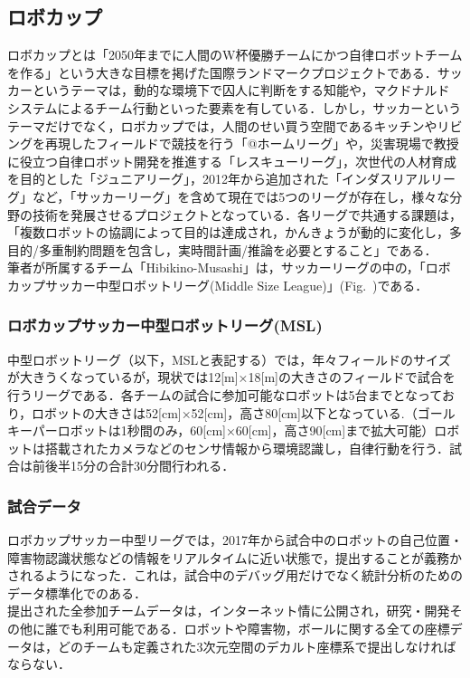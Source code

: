 \subsection{ロボカップ}%
ロボカップとは「2050年までに人間のW杯優勝チームにかつ自律ロボットチームを作る」という大きな目標を掲げた国際ランドマークプロジェクトである．サッカーというテーマは，動的な環境下で囚人に判断をする知能や，マクドナルド システムによるチーム行動といった要素を有している．しかし，サッカーというテーマだけでなく，ロボカップでは，人間のせい買う空間であるキッチンやリビングを再現したフィールドで競技を行う「@ホームリーグ」や，災害現場で教授に役立つ自律ロボット開発を推進する「レスキューリーグ」，次世代の人材育成を目的とした「ジュニアリーグ」，2012年から追加された「インダスリアルリーグ」など，「サッカーリーグ」を含めて現在では5つのリーグが存在し，様々な分野の技術を発展させるプロジェクトとなっている．各リーグで共通する課題は，「複数ロボットの協調によって目的は達成され，かんきょうが動的に変化し，多目的/多重制約問題を包含し，実時間計画/推論を必要とすること」である．\\
筆者が所属するチーム「Hibikino-Musashi」は，サッカーリーグの中の，「ロボカップサッカー中型ロボットリーグ(Middle Size League)」(Fig.~)である．

\subsubsection{ロボカップサッカー中型ロボットリーグ(MSL)}%
中型ロボットリーグ（以下，MSLと表記する）では，年々フィールドのサイズが大きうくなっているが，現状では12[m]×18[m]の大きさのフィールドで試合を行うリーグである．各チームの試合に参加可能なロボットは5台までとなっており，ロボットの大きさは52[cm]×52[cm]，高さ80[cm]以下となっている.（ゴールキーパーロボットは1秒間のみ，60[cm]×60[cm]，高さ90[cm]まで拡大可能）ロボットは搭載されたカメラなどのセンサ情報から環境認識し，自律行動を行う．試合は前後半15分の合計30分間行われる．

\subsubsection{試合データ}%
ロボカップサッカー中型リーグでは，2017年から試合中のロボットの自己位置・障害物認識状態などの情報をリアルタイムに近い状態で，提出することが義務かされるようになった．これは，試合中のデバッグ用だけでなく統計分析のためのデータ標準化でのある．\\
提出された全参加チームデータは，インターネット情に公開され，研究・開発その他に誰でも利用可能である．ロボットや障害物，ボールに関する全ての座標データは，どのチームも定義された3次元空間のデカルト座標系で提出しなければならない．
